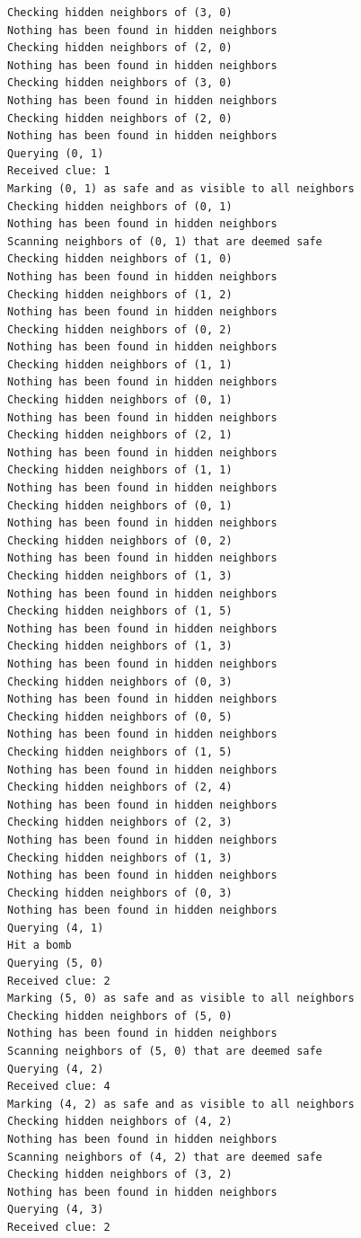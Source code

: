 \documentclass[13pt]{report}
\begin{document}
\begin{verbatim}
Checking hidden neighbors of (3, 0)
Nothing has been found in hidden neighbors
Checking hidden neighbors of (2, 0)
Nothing has been found in hidden neighbors
Checking hidden neighbors of (3, 0)
Nothing has been found in hidden neighbors
Checking hidden neighbors of (2, 0)
Nothing has been found in hidden neighbors
Querying (0, 1)
Received clue: 1
Marking (0, 1) as safe and as visible to all neighbors
Checking hidden neighbors of (0, 1)
Nothing has been found in hidden neighbors
Scanning neighbors of (0, 1) that are deemed safe
Checking hidden neighbors of (1, 0)
Nothing has been found in hidden neighbors
Checking hidden neighbors of (1, 2)
Nothing has been found in hidden neighbors
Checking hidden neighbors of (0, 2)
Nothing has been found in hidden neighbors
Checking hidden neighbors of (1, 1)
Nothing has been found in hidden neighbors
Checking hidden neighbors of (0, 1)
Nothing has been found in hidden neighbors
Checking hidden neighbors of (2, 1)
Nothing has been found in hidden neighbors
Checking hidden neighbors of (1, 1)
Nothing has been found in hidden neighbors
Checking hidden neighbors of (0, 1)
Nothing has been found in hidden neighbors
Checking hidden neighbors of (0, 2)
Nothing has been found in hidden neighbors
Checking hidden neighbors of (1, 3)
Nothing has been found in hidden neighbors
Checking hidden neighbors of (1, 5)
Nothing has been found in hidden neighbors
Checking hidden neighbors of (1, 3)
Nothing has been found in hidden neighbors
Checking hidden neighbors of (0, 3)
Nothing has been found in hidden neighbors
Checking hidden neighbors of (0, 5)
Nothing has been found in hidden neighbors
Checking hidden neighbors of (1, 5)
Nothing has been found in hidden neighbors
Checking hidden neighbors of (2, 4)
Nothing has been found in hidden neighbors
Checking hidden neighbors of (2, 3)
Nothing has been found in hidden neighbors
Checking hidden neighbors of (1, 3)
Nothing has been found in hidden neighbors
Checking hidden neighbors of (0, 3)
Nothing has been found in hidden neighbors
Querying (4, 1)
Hit a bomb
Querying (5, 0)
Received clue: 2
Marking (5, 0) as safe and as visible to all neighbors
Checking hidden neighbors of (5, 0)
Nothing has been found in hidden neighbors
Scanning neighbors of (5, 0) that are deemed safe
Querying (4, 2)
Received clue: 4
Marking (4, 2) as safe and as visible to all neighbors
Checking hidden neighbors of (4, 2)
Nothing has been found in hidden neighbors
Scanning neighbors of (4, 2) that are deemed safe
Checking hidden neighbors of (3, 2)
Nothing has been found in hidden neighbors
Querying (4, 3)
Received clue: 2

\end{verbatim}
\end{document}
